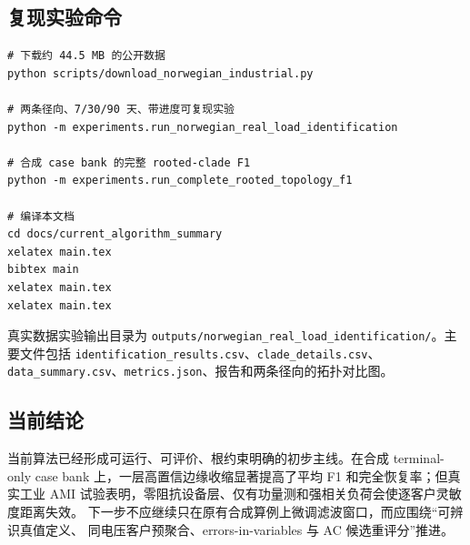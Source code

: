 \subsection{复现实验命令}

\begin{verbatim}
# 下载约 44.5 MB 的公开数据
python scripts/download_norwegian_industrial.py

# 两条径向、7/30/90 天、带进度可复现实验
python -m experiments.run_norwegian_real_load_identification

# 合成 case bank 的完整 rooted-clade F1
python -m experiments.run_complete_rooted_topology_f1

# 编译本文档
cd docs/current_algorithm_summary
xelatex main.tex
bibtex main
xelatex main.tex
xelatex main.tex
\end{verbatim}

真实数据实验输出目录为
\nolinkurl{outputs/norwegian_real_load_identification/}。主要文件包括
\nolinkurl{identification_results.csv}、\nolinkurl{clade_details.csv}、
\nolinkurl{data_summary.csv}、\nolinkurl{metrics.json}、报告和两条径向的拓扑对比图。

\subsection{当前结论}

当前算法已经形成可运行、可评价、根约束明确的初步主线。在合成 terminal-only
case bank 上，一层高置信边缘收缩显著提高了平均 F1 和完全恢复率；但真实工业
AMI 试验表明，零阻抗设备层、仅有功量测和强相关负荷会使逐客户灵敏度距离失效。
下一步不应继续只在原有合成算例上微调滤波窗口，而应围绕“可辨识真值定义、
同电压客户预聚合、errors-in-variables 与 AC 候选重评分”推进。
